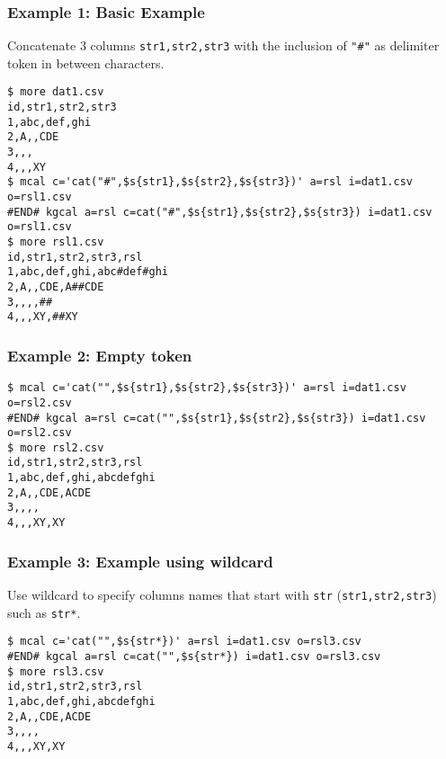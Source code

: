 \subsubsection*{Example 1: Basic Example}

Concatenate 3 columns \verb|str1,str2,str3| with the inclusion of \verb|"#"| as delimiter token in between characters.


\begin{Verbatim}[baselinestretch=0.7,frame=single]
$ more dat1.csv
id,str1,str2,str3
1,abc,def,ghi
2,A,,CDE
3,,,
4,,,XY
$ mcal c='cat("#",$s{str1},$s{str2},$s{str3})' a=rsl i=dat1.csv o=rsl1.csv
#END# kgcal a=rsl c=cat("#",$s{str1},$s{str2},$s{str3}) i=dat1.csv o=rsl1.csv
$ more rsl1.csv
id,str1,str2,str3,rsl
1,abc,def,ghi,abc#def#ghi
2,A,,CDE,A##CDE
3,,,,##
4,,,XY,##XY
\end{Verbatim}
\subsubsection*{Example 2: Empty token}



\begin{Verbatim}[baselinestretch=0.7,frame=single]
$ mcal c='cat("",$s{str1},$s{str2},$s{str3})' a=rsl i=dat1.csv o=rsl2.csv
#END# kgcal a=rsl c=cat("",$s{str1},$s{str2},$s{str3}) i=dat1.csv o=rsl2.csv
$ more rsl2.csv
id,str1,str2,str3,rsl
1,abc,def,ghi,abcdefghi
2,A,,CDE,ACDE
3,,,,
4,,,XY,XY
\end{Verbatim}
\subsubsection*{Example 3: Example using wildcard}

Use wildcard to specify columns names that start with \verb|str| (\verb|str1,str2,str3|) such as \verb|str*|.


\begin{Verbatim}[baselinestretch=0.7,frame=single]
$ mcal c='cat("",$s{str*})' a=rsl i=dat1.csv o=rsl3.csv
#END# kgcal a=rsl c=cat("",$s{str*}) i=dat1.csv o=rsl3.csv
$ more rsl3.csv
id,str1,str2,str3,rsl
1,abc,def,ghi,abcdefghi
2,A,,CDE,ACDE
3,,,,
4,,,XY,XY
\end{Verbatim}
